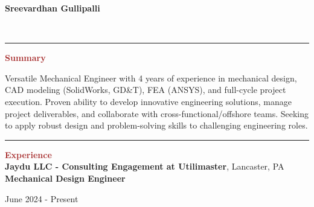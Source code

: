 \documentclass[11pt, letterpaper]{article}
\begin{document}
\begin{centering}
{\hfill{\huge \textbf{Sreevardhan Gullipalli}}\vspace{2pt}\hfill}
\end{centering}
\begin{flushleft}
%
\\ %
\end{flushleft}
\vspace{-8pt}
\noindent \rule[2pt]{\textwidth}{0.5pt} \vspace{-8mm}
\noindent \textbf{\large \textcolor{Brown}{Summary}}\vspace{2pt}\\
\begin{justify}
Versatile Mechanical Engineer with 4 years of experience in mechanical design, CAD modeling (SolidWorks, GD\&T), FEA (ANSYS), and full-cycle project execution. Proven ability to develop innovative engineering solutions, manage project deliverables, and collaborate with cross-functional/offshore teams. Seeking to apply robust design and problem-solving skills to challenging engineering roles.
\end{justify}
\vspace{-8pt}
\noindent \rule[2pt]{\textwidth}{0.5pt}
\noindent \textbf{\large \textcolor{Brown}{Experience}}\vspace{4pt}\\
\textbf{Jaydu LLC - Consulting Engagement at Utilimaster}, Lancaster, PA\\
\textbf{Mechanical Design Engineer}\hfill \raggedright{June 2024 - Present}\\ %
\end{document}
